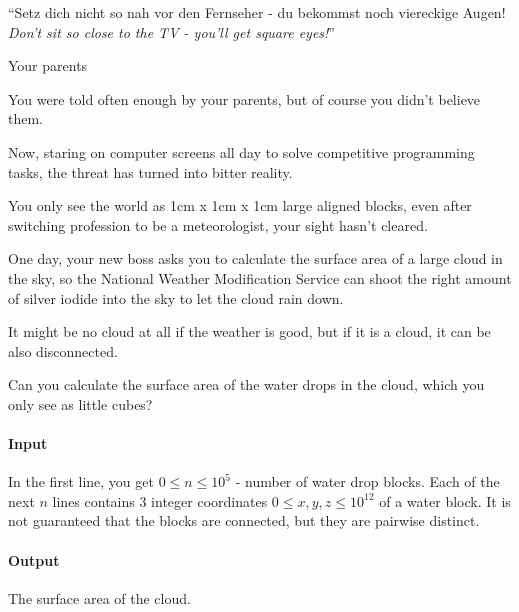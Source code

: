 

\usepackage{epigraph}



\makeheader

\epigraph{``Setz dich nicht so nah vor den Fernseher - du bekommst noch
  viereckige Augen!\\ \textit{Don't sit so close to the TV - you'll get square
    eyes!}''}{Your parents}

You were told often enough by your parents, but of course you didn't believe them.

Now, staring on computer screens all day to solve competitive programming tasks, the threat has turned into bitter reality.

You only see the world as 1cm x 1cm x 1cm large aligned blocks, even after switching profession to be a meteorologist, your sight hasn't cleared.

One day, your new boss asks you to calculate the surface area of a large cloud in the sky, so the National Weather Modification Service can shoot the right amount of silver iodide into the sky to let the cloud rain down.

It might be no cloud at all if the weather is good, but if it is a cloud, it can be also disconnected.

Can you calculate the surface area of the water drops in the cloud, which you only see as little cubes?

\paragraph*{Input}

In the first line, you get $0 \leq n \leq 10^5$ - number of water drop blocks.
Each of the next $n$ lines contains 3 integer coordinates $0 \leq x, y, z \leq 10^{12}$ of a water block. It is not guaranteed that the blocks are connected, but they are pairwise distinct.

\paragraph*{Output}

The surface area of the cloud.

\begin{samples}
\end{samples}

